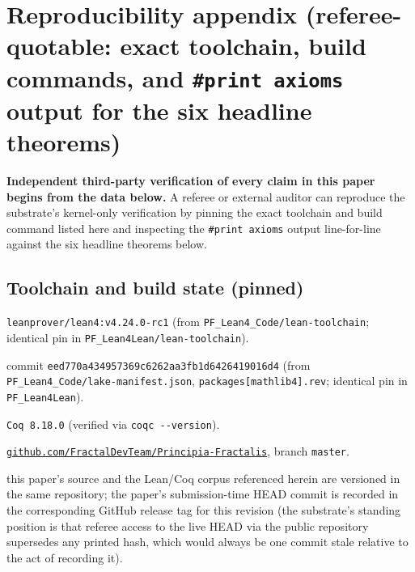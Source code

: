 \documentclass[11pt,a4paper]{amsart}
\theoremstyle{plain}
\theoremstyle{definition}
\begin{document}
\appendix
\section{Reproducibility appendix (referee-quotable: exact toolchain, build commands, and \texttt{\#print axioms} output for the six headline theorems)}\label{sec:reproducibility-appendix}

\textbf{Independent third-party verification of every claim in this paper begins from the data below.} A referee or external auditor can reproduce the substrate's kernel-only verification by pinning the exact toolchain and build command listed here and inspecting the \texttt{\#print axioms} output line-for-line against the six headline theorems below.

\subsection{Toolchain and build state (pinned)}\label{subsec:repro-toolchain}

\begin{description}[font=\normalfont\bfseries,leftmargin=2em,itemsep=2pt]
\item[Lean toolchain] \texttt{leanprover/lean4:v4.24.0-rc1} (from \texttt{PF\_Lean4\_Code/lean-toolchain}; identical pin in \texttt{PF\_Lean4Lean/lean-toolchain}).
\item[mathlib revision] commit \texttt{eed770a434957369c6262aa3fb1d6426419016d4} (from \texttt{PF\_Lean4\_Code/lake-manifest.json}, \texttt{packages[mathlib4].rev}; identical pin in \texttt{PF\_Lean4Lean}).
\item[Coq version] \texttt{Coq 8.18.0} (verified via \texttt{coqc -{}-version}).
\item[Repository] \href{https://github.com/FractalDevTeam/Principia-Fractalis}{\texttt{github.com/FractalDevTeam/Principia-Fractalis}}, branch \texttt{master}.
\item[Paper-revision HEAD at submission] this paper's source and the Lean/Coq corpus referenced herein are versioned in the same repository; the paper's submission-time HEAD commit is recorded in the corresponding GitHub release tag for this revision (the substrate's standing position is that referee access to the live HEAD via the public repository supersedes any printed hash, which would always be one commit stale relative to the act of recording it).
\end{description}
\end{document}
